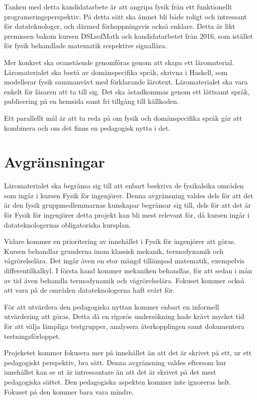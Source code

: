 \begin{draft}

Tanken med detta kandidatarbete är att angripa fysik från ett funktionellt programeringsperspektiv. På detta sätt ska ämnet bli både roligt och intressant för datateknologer, och därmed förhoppningsvis också enklare. Detta är likt premissen bakom kursen DSLsofMath och kandidatarbetet från 2016, som istället för fysik behandlade matematik respektive signallära.

Mer konkret ska ovanstående genomföras genom att skapa ett läromaterial. Läromaterialet ska bestå av domänspecifika språk, skrivna i Haskell, som modellerar fysik sammanvävt med förklarande lärotext. Läromaterialet ska vara enkelt för läsaren att ta till sig. Det ska åstadkommas genom ett lättsamt språk, publicering på en hemsida samt fri tillgång till källkoden.

Ett parallellt mål är att ta reda på om fysik och domänspecifika språk går att kombinera och om det finns en pedagogisk nytta i det.

\end{draft}

\section{Avgränsningar}
\label{sec:avgransningar}

\begin{draft}

Läromaterialet ska begränsa sig till att enbart beskriva de fysikalsika områden som ingår i kursen Fysik för ingenjörer. Denna avgränsning valdes dels för att det är den fysik gruppmedlemmarnas kunskapar begränsar sig till, dels för att det är för Fysik för ingenjörer detta projekt kan bli mest relevant för, då kursen ingår i datateknologernas obligatoriska kursplan.

Vidare kommer en prioritering av innehållet i Fysik för ingenjörer att göras. Kursen behandlar grunderna inom klassisk mekanik, termodynamik och vågrörelselära. Det ingår även en stor mängd tillämpad matematik, exempelvis differentilkalkyl. I första hand kommer mekaniken behandlas, för att sedan i mån av tid även behandla termodynamik och vågrörelselära. Fokuset kommer också att vara på de områden datateknologerna haft svårt för.

För att utvärdera den pedagogiska nyttan kommer enbart en informell utvärdering att göras. Detta då en rigorös undersökning hade krävt mycket tid för att välja lämpliga testgrupper, analysera återkopplingen samt dokumentera testningsförloppet.

Projeketet kommer fokusera mer på innehållet än att det är skrivet på ett, ur ett pedagogiskt perspektiv, bra sätt. Denna avgränsning valdes eftersom hur innehållet kan se ut är intressantare än att det är skrivet på det mest pedagogiska sättet. Den pedagogiska aspekten kommer inte ignoreras helt. Fokuset på den kommer bara vara mindre.

\end{draft}



